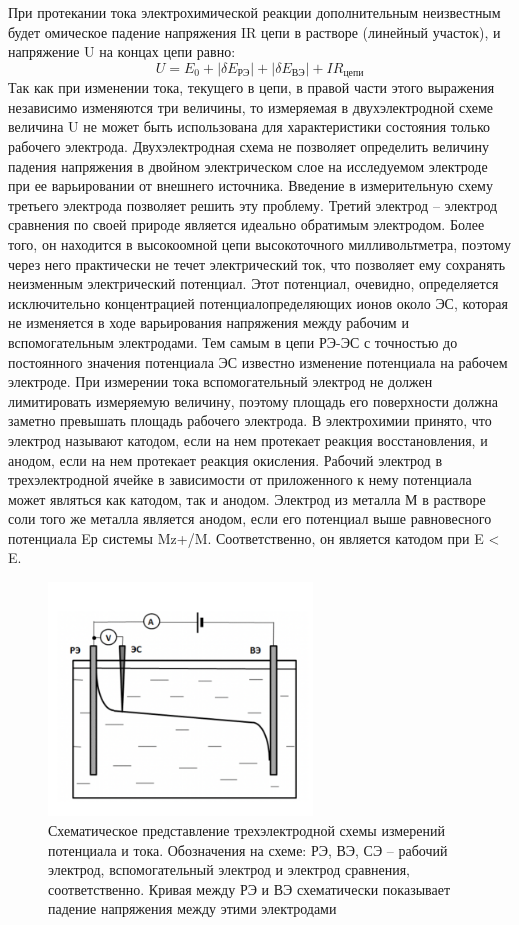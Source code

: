 \documentclass[a4paper,12pt]{article}
\begin{document}
При протекании тока электрохимической реакции дополнительным неизвестным будет омическое падение напряжения
IR
цепи в растворе (линейный участок), и напряжение U на концах цепи равно:
\[
U = E_{0} + |\delta E_{\text{РЭ}}| + |\delta E_{\text{ВЭ}}|+ IR_{\text{цепи}}
\]
Так как при изменении тока, текущего в цепи, в правой части этого выражения
независимо изменяются три величины, то измеряемая в двухэлектродной схеме
величина U не может быть использована для характеристики состояния только
рабочего электрода. Двухэлектродная схема не позволяет определить величину
падения напряжения в двойном электрическом слое на исследуемом электроде при
ее варьировании от внешнего источника. Введение в измерительную схему третьего
электрода позволяет решить эту проблему.
Третий электрод – электрод сравнения по своей природе является идеально
обратимым электродом. Более того, он находится в высокоомной цепи высокоточного милливольтметра, поэтому через него практически не течет электрический
ток, что позволяет ему сохранять неизменным электрический потенциал. Этот потенциал, очевидно, определяется исключительно концентрацией потенциалопределяющих ионов около ЭС, которая не изменяется в ходе варьирования напряжения
между рабочим и вспомогательным электродами. Тем самым в цепи РЭ-ЭС с точностью до постоянного значения потенциала ЭС известно изменение потенциала
на рабочем электроде.
При измерении тока вспомогательный электрод не должен лимитировать измеряемую величину, поэтому площадь его поверхности должна заметно превышать
площадь рабочего электрода.
В электрохимии принято, что электрод называют катодом, если на нем протекает реакция восстановления, и анодом, если на нем протекает реакция окисления.
Рабочий электрод в трехэлектродной ячейке в зависимости от приложенного к
нему потенциала может являться как катодом, так и анодом. Электрод из металла
М в растворе соли того же металла является анодом, если его потенциал выше равновесного потенциала Eр системы Mz+/M. Соответственно, он является катодом
при E < E.

\begin{figure}[h!]
    \centering
    \includegraphics[width=7cm]{4.png}
    \caption{Схематическое представление трехэлектродной схемы измерений потенциала и тока. Обозначения на схеме: РЭ, ВЭ, СЭ – рабочий электрод, вспомогательный электрод и электрод сравнения, соответственно. Кривая между РЭ и ВЭ схематически показывает падение напряжения между этими электродами}
    \label{fig:vac}
\end{figure}
\end{document}
